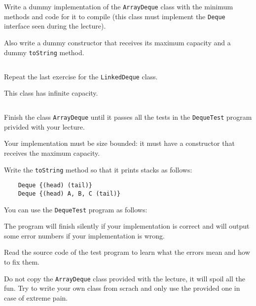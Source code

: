 \documentclass[a4paper, 11pt]{article}
\begin{document}
Write a dummy implementation of the \texttt{ArrayDeque} class with the minimum
methods and code for it to compile (this class must implement the
\texttt{Deque} interface seen during the lecture).

Also write a dummy constructor that receives its maximum capacity and a dummy
\verb+toString+ method.

\subsection{}

Repeat the last exercise for the \texttt{LinkedDeque} class.

This class has infinite capacity.

\subsection{}

Finish the class \texttt{ArrayDeque} until it passes all the tests in the
\verb+DequeTest+ program privided with your lecture.

Your implementation must be size bounded: it must have a constructor that
receives the maximum capacity.

Write the \verb+toString+ method so that it prints stacks as follows:

\begin{verbatim}
    Deque {(head) (tail)}
    Deque {(head) A, B, C (tail)}
\end{verbatim}

You can use the \texttt{DequeTest} program as follows:


The program will finish silently if your implementation is correct and will
output some error numbers if your implementation is wrong.

Read the source code of the test program to learn what the errors mean
and how to fix them.

Do not copy the \texttt{ArrayDeque} class provided with the lecture, it will
spoil all the fun. Try to write your own class from scrach and only use the
provided one in case of extreme pain.

\subsection{}
\end{document}
